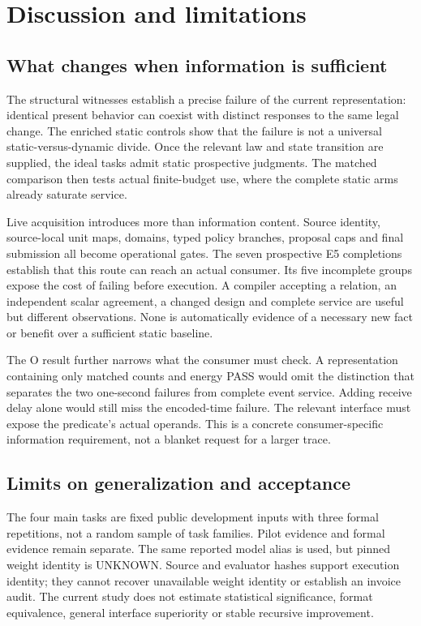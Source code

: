 \section{Discussion and limitations}
\subsection{What changes when information is sufficient}
The structural witnesses establish a precise failure of the current
representation: identical present behavior can coexist with distinct
responses to the same legal change. The enriched static controls
show that the failure is not a universal static-versus-dynamic
divide. Once the relevant law and state transition are supplied,
the ideal tasks admit static prospective judgments. The matched
comparison then tests actual finite-budget use, where the complete
static arms already saturate service.

Live acquisition introduces more than information content. Source
identity, source-local unit maps, domains, typed policy branches,
proposal caps and final submission all become operational gates.
The seven prospective E5 completions establish that this route can
reach an actual consumer. Its five incomplete groups expose the
cost of failing before execution. A compiler accepting a relation,
an independent scalar agreement, a changed design and complete
service are useful but different observations. None is automatically
evidence of a necessary new fact or benefit over a sufficient static
baseline.

The O result further narrows what the consumer must check. A
representation containing only matched counts and energy PASS
would omit the distinction that separates the two one-second
failures from complete event service. Adding receive delay alone
would still miss the encoded-time failure. The relevant interface
must expose the predicate's actual operands. This is a concrete
consumer-specific information requirement, not a blanket request
for a larger trace.

\subsection{Limits on generalization and acceptance}
The four main tasks are fixed public development inputs with three
formal repetitions, not a random sample of task families. Pilot
evidence and formal evidence remain separate. The same reported
model alias is used, but pinned weight identity is UNKNOWN. Source
and evaluator hashes support execution identity; they cannot
recover unavailable weight identity or establish an invoice audit.
The current study does not estimate statistical significance,
format equivalence, general interface superiority or stable
recursive improvement.

